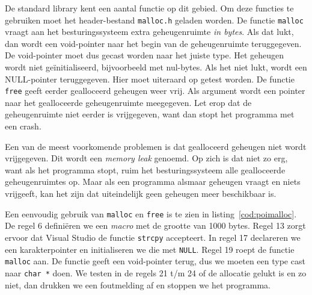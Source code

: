 De standard library kent een aantal functie op dit gebied. Om deze functies te gebruiken moet het header-bestand \texttt{malloc.h} geladen worden. De functie \texttt{malloc} vraagt aan het besturingssysteem extra geheugenruimte \textsl{in bytes}. Als dat lukt, dan wordt een void-pointer naar het begin van de geheugenruimte teruggegeven. De void-pointer moet dus gecast worden naar het juiste type. Het geheugen wordt niet geïnitialiseerd, bijvoorbeeld met nul-bytes. Als het niet lukt, wordt een NULL-pointer teruggegeven. Hier moet uiteraard op getest worden. De functie \texttt{free} geeft eerder gealloceerd geheugen weer vrij. Als argument wordt een pointer naar het gealloceerde geheugenruimte meegegeven. Let erop dat de geheugenruimte niet eerder is vrijgegeven, want dan stopt het programma met een crash.

Een van de meest voorkomende problemen is dat gealloceerd geheugen niet wordt vrijgegeven. Dit wordt een \textsl{memory leak} genoemd. Op zich is dat niet zo erg, want als het programma stopt, ruim het besturingssysteem alle gealloceerde geheugenruimtes op. Maar als een programma alsmaar geheugen vraagt en niets vrijgeeft, kan het zijn dat uiteindelijk geen geheugen meer beschikbaar is.

Een eenvoudig gebruik van \texttt{malloc} en \texttt{free} is te zien in listing~\ref{cod:poimalloc}. De regel 6 definiëren we een \textsl{macro} met de grootte van 1000 bytes. Regel 13 zorgt ervoor dat Visual Studio de functie \texttt{strcpy} accepteert. In regel 17 declareren we een karakterpointer en initialiseren we die met \texttt{NULL}. Regel 19 roept de functie \texttt{malloc} aan. De functie geeft een void-pointer terug, dus we moeten een type cast naar \texttt{char *} doen. We testen in de regels 21 t/m 24 of de allocatie gelukt is en zo niet, dan drukken we een foutmelding af en stoppen we het programma.

